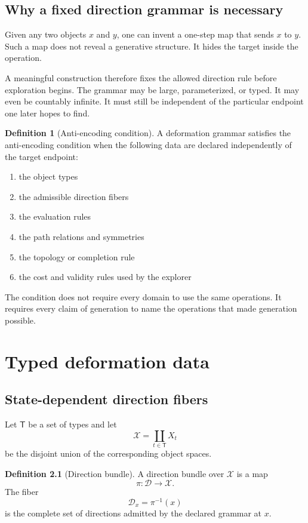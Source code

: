 \documentclass[11pt,openany]{report}
\theoremstyle{definition}
\newtheorem{definition}[theorem]{Definition}
\theoremstyle{remark}
\newcommand{\Dcal}{\mathcal D}
\newcommand{\Xcal}{\mathcal X}
\begin{document}
\section{Why a fixed direction grammar is necessary}

Given any two objects $x$ and $y$, one can invent a one-step map that sends $x$ to $y$. Such a map does not reveal a generative structure. It hides the target inside the operation.

A meaningful construction therefore fixes the allowed direction rule before exploration begins. The grammar may be large, parameterized, or typed. It may even be countably infinite. It must still be independent of the particular endpoint one later hopes to find.

\begin{definition}[Anti-encoding condition]
A deformation grammar satisfies the anti-encoding condition when the following data are declared independently of the target endpoint:
\begin{enumerate}[label=(\alph*)]
\item the object types
\item the admissible direction fibers
\item the evaluation rules
\item the path relations and symmetries
\item the topology or completion rule
\item the cost and validity rules used by the explorer
\end{enumerate}
\end{definition}

The condition does not require every domain to use the same operations. It requires every claim of generation to name the operations that made generation possible.

\chapter{Typed deformation data}

\section{State-dependent direction fibers}

Let $\mathsf T$ be a set of types and let
\[
\Xcal=\coprod_{t\in\mathsf T}X_t
\]
be the disjoint union of the corresponding object spaces.

\begin{definition}[Direction bundle]
A direction bundle over $\Xcal$ is a map
\[
\pi:\Dcal\longrightarrow\Xcal.
\]
The fiber
\[
\Dcal_x=\pi^{-1}(x)
\]
is the complete set of directions admitted by the declared grammar at $x$.
\end{definition}
\end{document}
